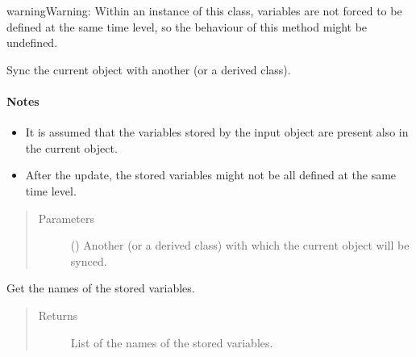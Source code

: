 \documentclass[letterpaper,10pt,english]{sphinxmanual}
\begin{document}
\begin{fulllineitems}
\begin{fulllineitems}
\begin{quote}
\begin{description}
\end{description}\end{quote}

\begin{sphinxadmonition}{warning}{Warning:}
Within an instance of this class, variables are not forced to be defined at the same time level,
so the behaviour of this method might be undefined.
\end{sphinxadmonition}

\end{fulllineitems}


\begin{fulllineitems}
\label{\detokenize{api:storages.grid_data.GridData.update}}
Sync the current object with another {\hyperref[\detokenize{api:storages.grid_data.GridData}]{}} (or a derived class).
\paragraph{Notes}
\begin{itemize}
\item {} 
It is assumed that  the variables stored by the input object are present also in the current object.

\item {} 
After the update, the stored variables might not be all defined at the same time level.

\end{itemize}
\begin{quote}\begin{description}
\item[{Parameters}] \leavevmode
{} () \textendash{} Another {\hyperref[\detokenize{api:storages.grid_data.GridData}]{}} (or a derived class) with which the current object will be synced.

\end{description}\end{quote}

\end{fulllineitems}


\begin{fulllineitems}
\label{\detokenize{api:storages.grid_data.GridData.variable_names}}
Get the names of the stored variables.
\begin{quote}\begin{description}
\item[{Returns}] \leavevmode
List of the names of the stored variables.


\end{description}
\end{quote}
\end{fulllineitems}
\end{fulllineitems}
\end{document}
